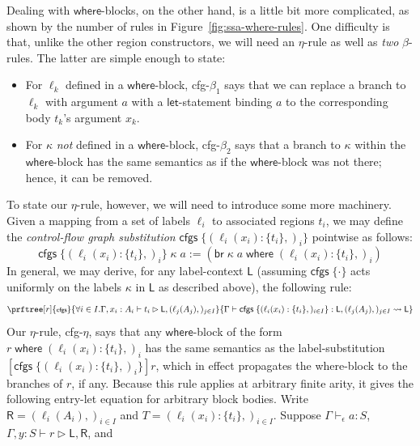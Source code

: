 \documentclass[acmsmall,screen,review]{acmart}
\newcommand{\ms}[1]{\ensuremath{\mathsf{#1}}}
\newcommand{\lto}{:}
\newcommand{\brb}[2]{\ms{br}\;#1\;#2}
\newcommand{\where}[2]{#1\;\ms{where}\;#2}
\newcommand{\wbranch}[3]{#1(#2) \lto \{#3\}}
\newcommand{\cfgsubst}[1]{\ms{cfgs}\;\{#1\}}
\newcommand{\bhyp}[2]{#1 : #2}
\newcommand{\lhyp}[2]{#1(#2)}
\newcommand{\rle}[1]{{\scriptsize\textsf{#1}}}
\newcommand{\hasty}[4]{#1 \vdash_{#2} #3: {#4}}
\newcommand{\haslb}[3]{#1 \vdash #2 \rhd #3}
\newcommand{\lbsubst}[4]{#1 \vdash #2: #3 \rightsquigarrow #4}
\newcommand{\brle}[1]{{\textsf{#1}}}
\begin{document}
Dealing with \ms{where}-blocks, on the other hand, is a little bit more complicated, as shown by the
number of rules in Figure~\ref{fig:ssa-where-rules}. One difficulty is that, unlike the other region
constructors, we will need an $\eta$-rule as well as \emph{two} $\beta$-rules. The latter are simple
enough to state:
\begin{itemize}
  \item For $\ell_k$ defined in a \ms{where}-block, \brle{cfg-$\beta_1$} says that we can replace a
  branch to $\ell_k$ with argument $a$ with a \ms{let}-statement binding $a$ to the corresponding
  body $t_k$'s argument $x_k$.
  \item For $\kappa$ \emph{not} defined in a \ms{where}-block, \brle{cfg-$\beta_2$} says that
  a branch to $\kappa$ within the \ms{where}-block has the same semantics as if the \ms{where}-block
  was not there; hence, it can be removed.
\end{itemize}
To state our $\eta$-rule, however, we will need to introduce some more machinery. Given a mapping
from a set of labels $\ell_i$ to associated regions $t_i$, we may define the \emph{control-flow
graph substitution} $\cfgsubst{(\wbranch{\ell_i}{x_i}{t_i},)_i}$ pointwise as follows:
\begin{equation}
  \cfgsubst{(\wbranch{\ell_i}{x_i}{t_i},)_i}\;\kappa\;a
  := (\where{\brb{\kappa}{a}}{(\wbranch{\ell_i}{x_i}{t_i},)_i})
\end{equation}
In general, we may derive, for any label-context $\ms{L}$ (assuming $\cfgsubst{\cdot}$ acts uniformly
on the labels $\kappa$ in $\ms{L}$ as described above), the following rule:
\begin{equation}
  \prftree[r]{\rle{cfgs}}
    {\forall i \in I. \haslb{\Gamma, \bhyp{x_i}{A_i}}{t_i}{\ms{L}, (\lhyp{\ell_j}{A_j},)_{j \in I}}}
    {\lbsubst{\Gamma}
      {\cfgsubst{(\wbranch{\ell_i}{x_i}{t_i},)_{i \in I}}}{\ms{L}, (\lhyp{\ell_j}{A_j},)_{j \in I}}{\ms{L}}}
\end{equation}
Our $\eta$-rule, \brle{cfg-$\eta$}, says that any \ms{where}-block of the form
$\where{r}{(\wbranch{\ell_i}{x_i}{t_i},)_i}$ has the same semantics as the label-substitution
$[\cfgsubst{(\wbranch{\ell_i}{x_i}{t_i},)_i}]r$, which in effect propagates the where-block to the
branches of $r$, if any. Because this rule applies at arbitrary finite arity,
it gives the following entry-let equation for arbitrary block bodies.
Write $\ms{R}=(\lhyp{\ell_i}{A_i},)_{i\in I}$ and
$T=(\wbranch{\ell_i}{x_i}{t_i},)_{i\in I}$.
Suppose $\hasty{\Gamma}{\epsilon}{a}{S}$,
$\haslb{\Gamma,\bhyp{y}{S}}{r}{\ms{L},\ms{R}}$, and
\end{document}
